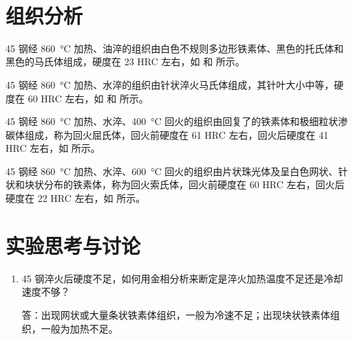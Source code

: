 \documentclass[a4paper,utf8]{article}
\begin{document}
\begin{figure}[!ht]
     \hspace{30pt}
     \\
\end{figure}
\section{组织分析}
45 钢经 \SI{860}{\degreeCelsius} 加热、油淬的组织由白色不规则多边形铁素体、黑色的托氏体和黑色的马氏体组成，硬度在 23 HRC 左右，如 和 所示。\par
45 钢经 \SI{860}{\degreeCelsius} 加热、水淬的组织由针状淬火马氏体组成，其针叶大小中等，硬度在 60 HRC 左右，如 和 所示。\par
45 钢经 \SI{860}{\degreeCelsius} 加热、水淬、\SI{400}{\degreeCelsius} 回火的组织由回复了的铁素体和极细粒状渗碳体组成，称为回火屈氏体，回火前硬度在 61 HRC 左右，回火后硬度在 41 HRC 左右，如 所示。\par
45 钢经 \SI{860}{\degreeCelsius} 加热、水淬、\SI{600}{\degreeCelsius} 回火的组织由片状珠光体及呈白色网状、针状和块状分布的铁素体，称为回火索氏体，回火前硬度在 60 HRC 左右，回火后硬度在 22 HRC 左右，如 所示。\par
\section{实验思考与讨论}
\begin{enumerate}
    \item 45 钢淬火后硬度不足，如何用金相分析来断定是淬火加热温度不足还是冷却速度不够？\par
    答：出现网状或大量条状铁素体组织，一般为冷速不足；出现块状铁素体组织，一般为加热不足。
\end{enumerate}
\end{document}
